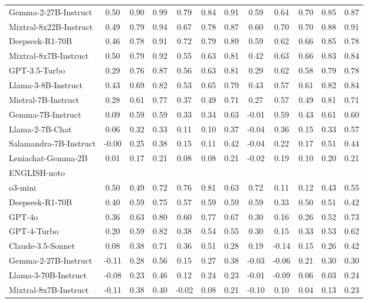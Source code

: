 \begin{table*}[ht]
{\begin{tabular}{lccccccccccc}
Gemma-2-27B-Instruct & 0.50 & 0.90 & 0.99 & 0.79 & 0.84 & 0.91 & 0.59 & 0.64 & 0.70 & 0.85 & 0.87 \\
Mixtral-8x22B-Instruct & 0.49 & 0.79 & 0.94 & 0.67 & 0.78 & 0.87 & 0.60 & 0.70 & 0.70 & 0.88 & 0.91\\
Deepseek-R1-70B & 0.46 & 0.78 & 0.91 & 0.72 & 0.79 & 0.89 & 0.59 & 0.62 & 0.66 & 0.85 & 0.78 \\
Mixtral-8x7B-Instruct & 0.50 & 0.79 & 0.92 & 0.55 & 0.63 & 0.81 & 0.42 & 0.63 & 0.66 & 0.83 & 0.84 \\
GPT-3.5-Turbo & 0.29 & 0.76 & 0.87 & 0.56 & 0.63 & 0.81 & 0.29 & 0.62 & 0.58 & 0.79 & 0.78 \\
Llama-3-8B-Instruct & 0.43 & 0.69 & 0.82 & 0.53 & 0.65 & 0.79 & 0.43 & 0.57 & 0.61 & 0.82 & 0.84 \\
Mistral-7B-Instruct & 0.28 & 0.61 & 0.77 & 0.37 & 0.49 & 0.71 & 0.27 & 0.57 & 0.49 & 0.81 & 0.71 \\
Gemma-7B-Instruct & 0.09 & 0.59 & 0.59 & 0.33 & 0.34 & 0.63 & -0.01 & 0.59 & 0.43 & 0.61 & 0.60 \\
Llama-2-7B-Chat & 0.06 & 0.32 & 0.33 & 0.11 & 0.10 & 0.37 & -0.04 & 0.36 & 0.15 & 0.33 & 0.57 \\
Salamandra-7B-Instruct & -0.00 & 0.25 & 0.38 & 0.15 & 0.11 & 0.42 & -0.04 & 0.22 & 0.17 & 0.51 & 0.44 \\
Leniachat-Gemma-2B & 0.01 & 0.17 & 0.21 & 0.08 & 0.08 & 0.21 & -0.02 & 0.19 & 0.10 & 0.20 & 0.21 \\
\midrule
ENGLISH-noto &&&&&&&&&&&\\
\midrule
o3-mini & 0.50 & 0.49 & 0.72 & 0.76 & 0.81 & 0.63 & 0.72 & 0.11 & 0.12 & 0.43 & 0.55 \\
Deepseek-R1-70B & 0.40 & 0.59 & 0.75 & 0.57 & 0.59 & 0.59 & 0.59 & 0.33 & 0.50 & 0.51 & 0.42 \\
GPT-4o & 0.36 & 0.63 & 0.80 & 0.60 & 0.77 & 0.67 & 0.30 & 0.16 & 0.26 & 0.52 & 0.73 \\
GPT-4-Turbo & 0.20 & 0.59 & 0.82 & 0.38 & 0.54 & 0.55 & 0.30 & 0.15 & 0.33 & 0.53 & 0.62 \\
Claude-3.5-Sonnet & 0.08 & 0.38 & 0.71 & 0.36 & 0.51 & 0.28 & 0.19 & -0.14 & 0.15 & 0.26 & 0.42 \\
Gemma-2-27B-Instruct & -0.11 & 0.28 & 0.56 & 0.15 & 0.27 & 0.38 & -0.03 & -0.06 & 0.21 & 0.30 & 0.30 \\
Llama-3-70B-Instruct & -0.08 & 0.23 & 0.46 & 0.12 & 0.24 & 0.23 & -0.01 & -0.09 & 0.06 & 0.03 & 0.24 \\
Mixtral-8x7B-Instruct & -0.11 & 0.38 & 0.40 & -0.02 & 0.08 & 0.21 & -0.10 & 0.10 & 0.04 & 0.13 & 0.23 \\

\end{tabular}}
\end{table*}
